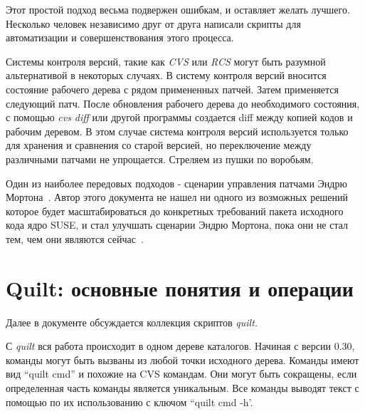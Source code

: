 \documentclass{article}
\newcommand{\quilt}[1]{\textsf{quilt #1}}
\newcommand{\prog}[1]{\textit{#1}}
\begin{document}
Этот простой подход весьма подвержен ошибкам, и оставляет желать лучшего. Несколько человек независимо друг от друга написали скрипты для автоматизации и совершенствования этого процесса.

Системы контроля версий, такие как \prog{CVS} или \prog{RCS} могут быть разумной альтернативой в некоторых случаях. В систему контроля версий вносится состояние рабочего дерева с рядом примененных патчей. Затем применяется следующий патч. После обновления рабочего дерева до необходимого состояния, с помощью \prog{cvs diff} или другой программы создается diff между копией кодов и рабочим деревом. В этом случае система контроля версий используется только для хранения и сравнения со старой версией, но переключение между различными патчами не упрощается. Стреляем из пушки по воробьям.


Один из наиболее передовых подходов - сценарии управления патчами Эндрю Мортона~\cite{akpm02}. Автор этого документа не нашел ни одного из возможных решений которое будет масштабироваться до конкретных требований пакета исходного кода ядро SUSE, и стал улучшать сценарии Эндрю Мортона, пока они не стал тем, чем они являются сейчас~\cite{quilt}.




\section{Quilt: основные понятия и операции}
\label{sec:basic}

Далее в документе обсуждается коллекция скриптов \textit{quilt.}

С \textit{quilt} вся работа происходит в одном дереве каталогов. Начиная с версии 0.30, команды могут быть вызваны из любой точки исходного дерева. Команды имеют вид ``\quilt{cmd}'' и похожие на CVS командам. Они могут быть сокращены, если определенная часть команды является уникальным. Все команды выводят текст с помощью по их использованию с ключом ``\quilt{cmd -h}'.
\end{document}
